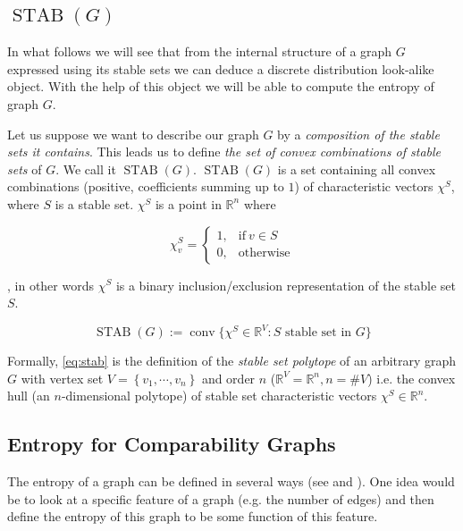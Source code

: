 


\subsection{$\operatorname{STAB}(G)$}
\label{tree:poset:graph:stab}

In what follows we will see that from the internal structure of a graph $G$ expressed using its stable sets we can deduce a discrete distribution look-alike object. With the help of this object we will be able to compute the entropy of graph $G$.

Let us suppose we want to describe our graph $G$ by a \emph{composition of the stable sets it contains}. This leads us to define \emph{the set of convex combinations of stable sets} of $G$. We call it $\operatorname{STAB}(G)$. $\operatorname{STAB}(G)$ is a set containing all convex combinations (positive, coefficients summing up to $1$) of characteristic vectors $\chi^S$, where $S$ is a stable set. $\chi^S$ is a point in $\mathbb{R}^n$ where

$$ \chi^S_v =\begin{cases}
      1, & \text{if}\ v \in S\\
      0, & \text{otherwise}
    \end{cases}$$


, in other words $\chi^S$ is a binary inclusion/exclusion representation of the stable set $S$.

\begin{equation}
\operatorname{STAB}(G) := \operatorname{conv}\{\chi^S \in \mathbb{R}^V : S\text{ stable set in }G\}
\label{eq:stab}
\end{equation}

Formally, \ref{eq:stab} is the definition of the \emph{stable set polytope} of an arbitrary graph $G$ with vertex set $V = \left\{{v_1, \cdots, v_n }\right\}$ and order $n$ ($\mathbb{R}^V = \mathbb{R}^n, n = \#V$) i.e. the convex hull (an $n$-dimensional polytope) of stable set characteristic vectors $\chi^S \in \mathbb{R}^n$.



\subsection{Entropy for Comparability Graphs}

The entropy of a graph can be defined in several ways (see \cite{mowshowitz2012entropy} and \cite{simonyi1995graph}). One idea would be to look at a specific feature of a graph (e.g. the number of edges) and then define the entropy of this graph to be some function of this feature.

